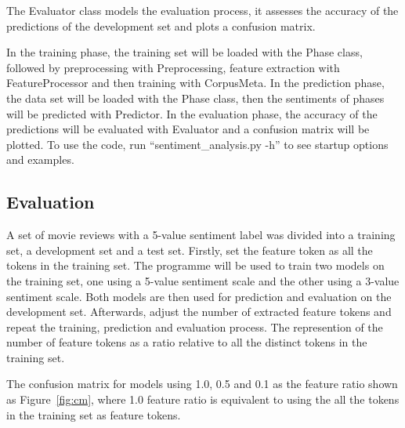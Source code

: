 \documentclass[11pt,a4paper]{article}
\begin{document}




The Evaluator class models the evaluation process, it assesses the accuracy of the predictions of the development set and plots a confusion matrix.

In the training phase, the training set will be loaded with the Phase class, followed by preprocessing with Preprocessing, feature extraction with FeatureProcessor and then training with CorpusMeta. In the prediction phase, the data set will be loaded with the Phase class, then the sentiments of phases will be predicted with Predictor. In the evaluation phase, the accuracy of the predictions will be evaluated with Evaluator and a confusion matrix will be plotted. To use the code, run ``sentiment\_analysis.py -h'' to see startup options and examples.

\subsection*{\Large Evaluation}

A set of movie reviews with a 5-value sentiment label was divided into a training set, a development set and a test set. Firstly, set the feature token as all the tokens in the training set. The programme will be used to train two models on the training set, one using a 5-value sentiment scale and the other using a 3-value sentiment scale. Both models are then used for prediction and evaluation on the development set. Afterwards, adjust the number of extracted feature tokens and repeat the training, prediction and evaluation process. The represention of the number of feature tokens as a ratio relative to all the distinct tokens in the training set.

The confusion matrix for models using 1.0, 0.5 and 0.1 as the feature ratio shown as Figure~\ref{fig:cm}, where 1.0 feature ratio is equivalent to using the all the tokens in the training set as feature tokens.
\end{document}
